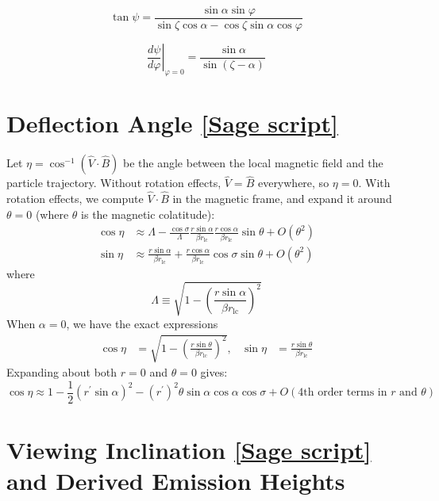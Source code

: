 \documentclass{book}
\newcommand{\phase}{\varphi}
\newcommand{\rL}{r_\text{lc}} %
\newcommand{\linktosage}[1]{\hyperref[#1]{[Sage script]}}
\begin{document}
\begin{equation}
    \tan{\psi} = \frac{\sin\alpha \sin\phase}{\sin\zeta\cos\alpha - \cos\zeta\sin\alpha\cos\phase}
\end{equation}

\begin{equation}
    \left.\frac{d\psi}{d\phase}\right|_{\phase=0} = \frac{\sin\alpha}{\sin(\zeta-\alpha)}
\end{equation}

\section{Deflection Angle \linktosage{sage:aberration_dip}}

Let $\eta = \cos^{-1}(\hat{V}\cdot\hat{B})$ be the angle between the local magnetic field and the particle trajectory.
Without rotation effects, $\hat{V} = \hat{B}$ everywhere, so $\eta = 0$.
With rotation effects, we compute $\hat{V}\cdot\hat{B}$ in the magnetic frame, and expand it around $\theta = 0$ (where $\theta$ is the magnetic colatitude):
\begin{equation}
    \begin{aligned}
        \cos\eta &\approx \Lambda - \frac{\cos\sigma}{\Lambda} \frac{r\sin\alpha}{\beta \rL} \frac{r\cos\alpha}{\beta \rL} \sin\theta +
                          O(\theta^2) \\
        \sin\eta &\approx \frac{r\sin\alpha}{\beta \rL} + \frac{r\cos\alpha}{\beta \rL}\cos\sigma\sin\theta +
                          O(\theta^2)
    \end{aligned}
\end{equation}
where
\begin{equation}
    \Lambda \equiv \sqrt{1-\left(\frac{r\sin\alpha}{\beta \rL}\right)^2}
\end{equation}
When $\alpha = 0$, we have the exact expressions
\begin{align}
    \cos\eta &= \sqrt{1-\left(\frac{r\sin\theta}{\beta \rL}\right)^2}, &
    \sin\eta &= \frac{r\sin\theta}{\beta \rL}
\end{align}
Expanding about both $r = 0$ and $\theta = 0$ gives:
\begin{equation}
    \cos\eta \approx 1 - \frac12(r^\prime\sin\alpha)^2 - (r^\prime)^2\theta\sin\alpha\cos\alpha\cos\sigma + O(\text{4th order terms in $r$ and $\theta$})
\end{equation}

\section{Viewing Inclination \linktosage{sage:zeta} and Derived Emission Heights}
\label{sec:zeta}
\end{document}
